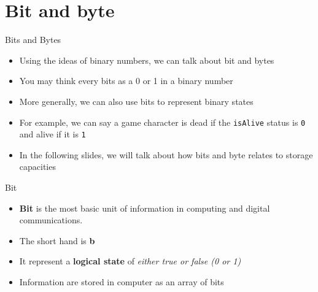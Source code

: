 \documentclass[10pt,xcolor={table,dvipsnames},t]{beamer}
\begin{document}
\section{Bit and byte}
\begin{frame}{Bits and Bytes}
  \begin{itemize}
    \item Using the ideas of binary numbers, we can talk about bit and bytes
    \item You may think every bits as a 0 or 1 in a binary number 
    \item More generally, we can also use bits to represent binary states 
    \item For example, we can say a game character is dead if the \texttt{isAlive} status is \texttt{0} and alive if it is \texttt{1}
    \item In the following slides, we will talk about how bits and byte relates to storage capacities
  \end{itemize}
\end{frame}


\begin{frame}{Bit}
  \begin{itemize}
    \item \textbf{Bit} is the most basic unit of information in computing and digital communications.
    \item The short hand is \textbf{b}
    \item It represent a \textbf{logical state} of \textit{either true or false (0 or 1)} 
    \item Information are stored in computer as an array of bits
  \end{itemize}
\end{frame}
\end{document}

